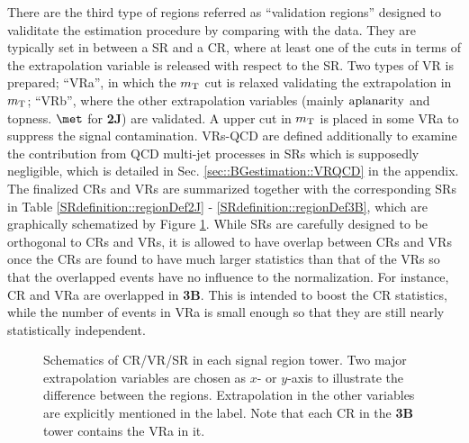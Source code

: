There are the third type of regions referred as ``validation regions'' designed to validitate the estimation procedure by comparing with the data. They are typically set in between a SR and a CR, where at least one of the cuts in terms of the extrapolation variable is released with respect to the SR. 
Two types of VR is prepared; ``VRa'', in which the $m_{\mathrm{T}}$ cut is relaxed validating the extrapolation in $m_{\mathrm{T}}$; ``VRb'', where the other extrapolation variables (mainly $\mathrm{aplanarity}$ and topness. $\met$ for \textbf{2J}) are validated. A upper cut in $m_{\mathrm{T}}$ is placed in some VRa to suppress the signal contamination. VRs-QCD are defined additionally to examine the contribution from QCD multi-jet processes in SRs which is supposedly negligible, which is detailed in Sec. \ref{sec::BGestimation::VRQCD} in the appendix. \\

The finalized CRs and VRs are summarized together with the corresponding SRs in Table \ref{SRdefinition::regionDef2J} - \ref{SRdefinition::regionDef3B}, which are graphically schematized by Figure \ref{fig::BGestimation::regionsPlot}. While SRs are carefully designed to be orthogonal to CRs and VRs, it is allowed to have overlap between CRs and VRs once the CRs are found to have much larger statistics than that of the VRs so that the overlapped events have no influence to the normalization. For instance, CR and VRa are overlapped in \textbf{3B}. This is intended to boost the CR statistics, while the number of events in VRa is small enough so that they are still nearly statistically independent. \\

\clearpage
\begin{figure}
  \centering
 \caption{ Schematics of CR/VR/SR in each signal region tower. Two major extrapolation variables are chosen as $x$- or $y$-axis to illustrate the difference between the regions. 
Extrapolation in the other variables are explicitly mentioned in the label. 
Note that each CR in the \textbf{3B} tower contains the VRa in it. 
   \label{fig::BGestimation::regionsPlot} 
 }
\end{figure}

